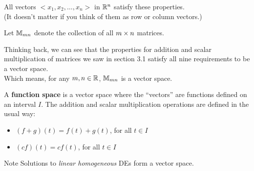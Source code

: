 \documentclass{beamer}
\begin{document}
\begin{frame}
\begin{example}
All vectors $<x_1,x_2,\dots,x_n>$ in $\mathbb{R}^n$ satisfy these properties.\\(It doesn't matter if you think of them as row or column vectors.)
\end{example}\pause

\begin{definition}
Let $\mathbb{M}_{mn}$ denote the collection of all $m \times n$ matrices.
\end{definition}\pause

\begin{example}
Thinking back, we can see that the properties for addition and scalar multiplication of matrices we saw in section 3.1 satisfy all nine requirements to be a vector space.\\Which means, for any $m,n\in\mathbb{R}$, $\mathbb{M}_{mn}$ is a vector space.
\end{example}
\end{frame}

\begin{frame}
\begin{definition}
A \textbf{function space} is a vector space where the ``vectors'' are functions defined on an interval $I$. The addition and scalar multiplication operations are defined in the usual way:
\begin{itemize}
\item $(f+g)(t) = f(t)+g(t)$, for all $t\in I$
\item $(cf)(t)=cf(t)$, for all $t\in I$
\end{itemize}
\end{definition}\pause

\begin{block}{Note}
Solutions to \emph{linear homogeneous} DEs form a vector space.
\end{block}
\end{frame}
\end{document}
